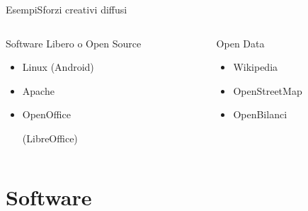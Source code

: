 \documentclass[italian,compress,red]{beamer}
\begin{document}
\begin{frame}{Esempi}{Sforzi creativi diffusi}
\begin{columns}[T]
  \begin{column}{.5\textwidth}
   
   \begin{exampleblock}{Software Libero o Open Source}
  \begin{itemize}
    \item Linux (Android)
    \item Apache
    \item OpenOffice \begin{tiny}(LibreOffice)\end{tiny}
  \end{itemize}
  \end{exampleblock}
  \end{column}
  \pause
  \begin{column}{.5\textwidth}
   \begin{exampleblock}{Open Data}
  \begin{itemize}
    \item Wikipedia
    \item OpenStreetMap
    \item {} \hspace{0.5ex} OpenBilanci
  \end{itemize}
  \end{exampleblock}
  \end{column}

  \end{columns}

\end{frame} 
  
\section{Software}
\end{document}
